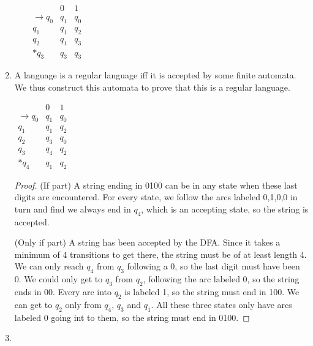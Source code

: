 \documentclass{article}
\begin{document}
\begin{enumerate}
\begin{enumerate}
                $ \begin{array}{r||c|c}
                            & 0 & 1 \\ \hline \hline
                    \to q_0 & q_1 & q_0 \\
                    q_1 & q_1 & q_2 \\
                    q_2 & q_1 & q_3 \\
                    *q_3 & q_3 & q_3
                \end{array}
                $

        \end{enumerate}

    \item
        A language is a regular language iff it is accepted by some finite automata. We thus construct this automata to prove that this is a regular language.

        $ \begin{array}{r||c|c}
            & 0 & 1 \\ \hline \hline
            \to q_0 & q_1 & q_0 \\
            q_1 & q_1 & q_2 \\
            q_2 & q_3 & q_0 \\
            q_3 & q_4 & q_2 \\
            *q_4 & q_1 & q_2
        \end{array}
        $

        \begin{proof}
            (If part) A string ending in 0100 can be in any state when these last digits are encountered. For every state, we follow the arcs labeled 0,1,0,0 in turn and find we always end in $q_4$, which is an accepting state, so the string is accepted.

            (Only if part) A string has been accepted by the DFA. Since it takes a minimum of 4 transitions to get there, the string must be of at least length 4. We can only reach $q_4$ from $q_3$ following a 0, so the last digit must have been 0. We could only get to $q_3$ from $q_2$, following the arc labeled 0, so the string ends in 00. Every arc into $q_2$ is labeled 1, so the string must end in 100. We can get to $q_2$ only from $q_4$, $q_3$ and $q_1$. All these three states only have arcs labeled 0 going int to them, so the string must end in 0100.
        \end{proof}


    \item


\end{enumerate}
\end{document}
